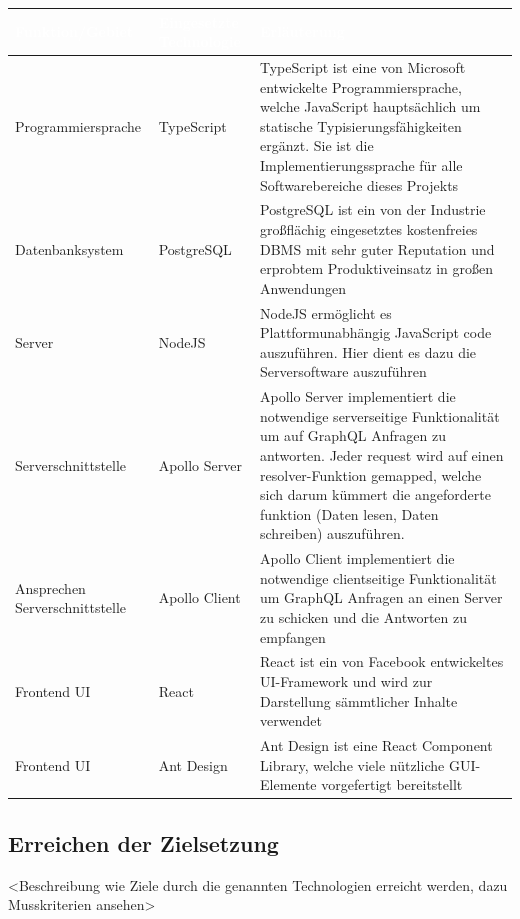 \documentclass[a4paper,12pt]{article}
\begin{document}
\begin{center}
      \begin{tabular}{|m{3.5cm}|m{3cm}|m{9cm}|}
            \hline
        \rowcolor{TUMBlue} \textcolor{white}{\textbf{Funktion/Gebiet}} & \textcolor{white}{\textbf{Eingesetzte Technologie}} & \textcolor{white}{\textbf{Erläuterung}} \\
        \hline
        Programmiersprache & TypeScript & TypeScript ist eine von Microsoft entwickelte Programmiersprache, welche JavaScript hauptsächlich um statische Typisierungsfähigkeiten ergänzt. Sie ist die Implementierungssprache für alle Softwarebereiche dieses Projekts \\
        \hline
        Datenbanksystem & PostgreSQL & PostgreSQL ist ein von der Industrie großflächig eingesetztes kostenfreies DBMS mit sehr guter Reputation und erprobtem Produktiveinsatz in großen Anwendungen \\
        \hline
        Server & NodeJS & NodeJS ermöglicht es Plattformunabhängig JavaScript code auszuführen. Hier dient es dazu die Serversoftware auszuführen \\
        \hline
        Serverschnittstelle & Apollo Server & Apollo Server implementiert die notwendige serverseitige Funktionalität um auf GraphQL Anfragen zu antworten. Jeder request wird auf einen resolver-Funktion gemapped, welche sich darum kümmert die angeforderte funktion (Daten lesen, Daten schreiben) auszuführen. \\
        \hline
        Ansprechen Serverschnittstelle & Apollo Client & Apollo Client implementiert die notwendige clientseitige Funktionalität um GraphQL Anfragen an einen Server zu schicken und die Antworten zu empfangen \\
        \hline
        Frontend UI & React & React ist ein von Facebook entwickeltes UI-Framework und wird zur Darstellung sämmtlicher Inhalte verwendet \\
        \hline
        Frontend UI & Ant Design & Ant Design ist eine React Component Library, welche viele nützliche GUI-Elemente vorgefertigt bereitstellt \\
        \hline
      \end{tabular}
\end{center}

\subsection{Erreichen der Zielsetzung}
<Beschreibung wie Ziele durch die genannten Technologien erreicht werden, dazu Musskriterien ansehen>
\end{document}
